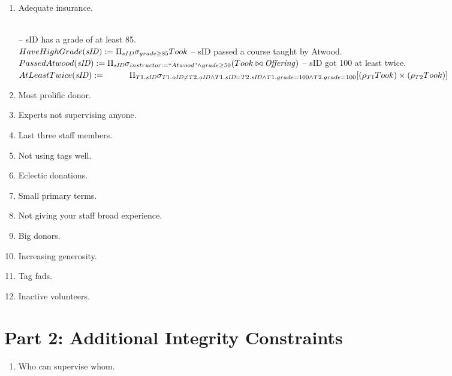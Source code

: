 \documentclass{article}
\newcommand{\var}[1]{\mathit{#1}}
\begin{document}
\begin{enumerate}
\item   %
Adequate insurance.

{~}\\ %
{\large %
-- sID has a grade of at least 85. \\[5pt]
$
HaveHighGrade(\var{sID}) := 
	\Pi_{sID} 
	\sigma_{grade \ge 85} 
	Took \\[10pt]
$
-- sID passed a course taught by Atwood. \\[5pt]
$
PassedAtwood(\var{sID}) := 
	\Pi_{\var{sID}} 
	\sigma_{instructor := ``Atwood" \wedge grade \ge 50} 
	(Took \bowtie \var{Offering}) 
	\\[10pt]
$
-- sID got 100 at least twice. \\[5pt]
$
AtLeastTwice(\var{sID}) := \\[5pt]  %
	\hspace*{1cm}  %
	\Pi_{T1.\var{sID}} 
	\sigma_{
		T1.\var{oID} \neq T2.\var{oID} \wedge 
		T1.\var{sID} = T2.\var{sID} \wedge 
		T1.grade = 100 \wedge T2.grade = 100}
	[ (\rho_{T1}Took) \times (\rho_{T2}Took) ] \\[5pt]
$
} %


\item   %
Most prolific donor.

\item   %
Experts not supervising anyone.

\item   %
Last three staff members.

\item   %
Not using tags well.

\item   %
Eclectic donations.

\item   %
Small primary terms.

\item   %
Not giving your staff broad experience.

\item   %
Big donors.

\item   %
Increasing generosity.

\item   %
Tag fads.

\item   %
Inactive volunteers.

\end{enumerate}






\section*{Part 2: Additional Integrity Constraints}

\begin{enumerate}

\item   %
Who can supervise whom.

\end{enumerate}
\end{document}
